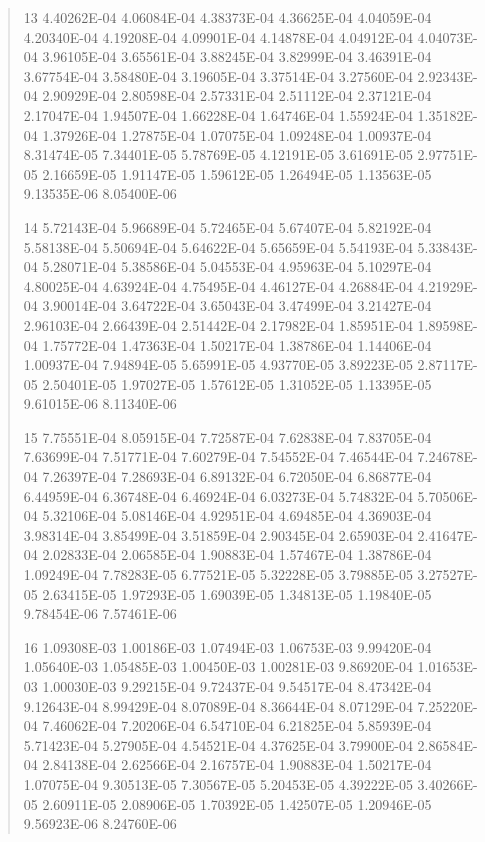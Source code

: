 \documentclass[letterpaper,10pt,english]{sphinxmanual}
\begin{document}
\begin{quote}
\begin{DUlineblock}{0em}
\item[] 13   4.40262E-04  4.06084E-04  4.38373E-04  4.36625E-04  4.04059E-04  4.20340E-04  4.19208E-04  4.09901E-04  4.14878E-04  4.04912E-04  4.04073E-04  3.96105E-04  3.65561E-04  3.88245E-04  3.82999E-04  3.46391E-04  3.67754E-04  3.58480E-04  3.19605E-04  3.37514E-04  3.27560E-04  2.92343E-04  2.90929E-04  2.80598E-04  2.57331E-04  2.51112E-04  2.37121E-04  2.17047E-04  1.94507E-04  1.66228E-04  1.64746E-04  1.55924E-04  1.35182E-04  1.37926E-04  1.27875E-04  1.07075E-04  1.09248E-04  1.00937E-04  8.31474E-05  7.34401E-05  5.78769E-05  4.12191E-05  3.61691E-05  2.97751E-05  2.16659E-05  1.91147E-05  1.59612E-05  1.26494E-05  1.13563E-05  9.13535E-06  8.05400E-06
\item[] 14   5.72143E-04  5.96689E-04  5.72465E-04  5.67407E-04  5.82192E-04  5.58138E-04  5.50694E-04  5.64622E-04  5.65659E-04  5.54193E-04  5.33843E-04  5.28071E-04  5.38586E-04  5.04553E-04  4.95963E-04  5.10297E-04  4.80025E-04  4.63924E-04  4.75495E-04  4.46127E-04  4.26884E-04  4.21929E-04  3.90014E-04  3.64722E-04  3.65043E-04  3.47499E-04  3.21427E-04  2.96103E-04  2.66439E-04  2.51442E-04  2.17982E-04  1.85951E-04  1.89598E-04  1.75772E-04  1.47363E-04  1.50217E-04  1.38786E-04  1.14406E-04  1.00937E-04  7.94894E-05  5.65991E-05  4.93770E-05  3.89223E-05  2.87117E-05  2.50401E-05  1.97027E-05  1.57612E-05  1.31052E-05  1.13395E-05  9.61015E-06  8.11340E-06
\item[] 15   7.75551E-04  8.05915E-04  7.72587E-04  7.62838E-04  7.83705E-04  7.63699E-04  7.51771E-04  7.60279E-04  7.54552E-04  7.46544E-04  7.24678E-04  7.26397E-04  7.28693E-04  6.89132E-04  6.72050E-04  6.86877E-04  6.44959E-04  6.36748E-04  6.46924E-04  6.03273E-04  5.74832E-04  5.70506E-04  5.32106E-04  5.08146E-04  4.92951E-04  4.69485E-04  4.36903E-04  3.98314E-04  3.85499E-04  3.51859E-04  2.90345E-04  2.65903E-04  2.41647E-04  2.02833E-04  2.06585E-04  1.90883E-04  1.57467E-04  1.38786E-04  1.09249E-04  7.78283E-05  6.77521E-05  5.32228E-05  3.79885E-05  3.27527E-05  2.63415E-05  1.97293E-05  1.69039E-05  1.34813E-05  1.19840E-05  9.78454E-06  7.57461E-06
\item[] 16   1.09308E-03  1.00186E-03  1.07494E-03  1.06753E-03  9.99420E-04  1.05640E-03  1.05485E-03  1.00450E-03  1.00281E-03  9.86920E-04  1.01653E-03  1.00030E-03  9.29215E-04  9.72437E-04  9.54517E-04  8.47342E-04  9.12643E-04  8.99429E-04  8.07089E-04  8.36644E-04  8.07129E-04  7.25220E-04  7.46062E-04  7.20206E-04  6.54710E-04  6.21825E-04  5.85939E-04  5.71423E-04  5.27905E-04  4.54521E-04  4.37625E-04  3.79900E-04  2.86584E-04  2.84138E-04  2.62566E-04  2.16757E-04  1.90883E-04  1.50217E-04  1.07075E-04  9.30513E-05  7.30567E-05  5.20453E-05  4.39222E-05  3.40266E-05  2.60911E-05  2.08906E-05  1.70392E-05  1.42507E-05  1.20946E-05  9.56923E-06  8.24760E-06

\end{DUlineblock}
\end{quote}
\end{document}
